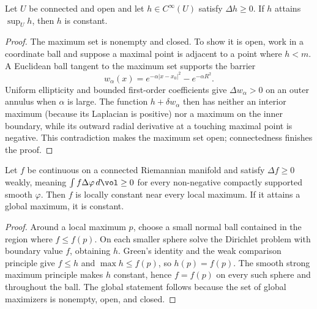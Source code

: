 \begin{lemma}
\label{lem:hopf-strong-maximum}



Let $U$ be connected and open and let $h\in C^\infty(U)$ satisfy
$\Delta h\ge0$. If $h$ attains $\sup_Uh$, then $h$ is constant.
\end{lemma}
\begin{proof}
\sketch
{}
\leanok
The maximum set is nonempty and closed. To show it is open, work in a
coordinate ball and suppose a maximal point is adjacent to a point where
$h<m$. A Euclidean ball tangent to the maximum set supports the barrier
$$w_\alpha(x)=e^{-\alpha|x-x_0|^2}-e^{-\alpha R^2}.$$
Uniform ellipticity and bounded first-order coefficients give
$\Delta w_\alpha>0$ on an outer annulus when $\alpha$ is large. The
function $h+\delta w_\alpha$ then has neither an interior maximum
(because its Laplacian is positive) nor a maximum on the inner boundary,
while its outward radial derivative at a touching maximal point is
negative. This contradiction makes the maximum set open; connectedness
finishes the proof.
\end{proof}

\begin{theorem}
\label{thm:maximum-principle}


Let $f$ be continuous on a connected Riemannian manifold and satisfy
$\Delta f\ge0$ weakly, meaning
$\int f\Delta\varphi\,d\vol\ge0$ for every non-negative compactly
supported smooth $\varphi$. Then $f$ is locally constant near every
local maximum. If it attains a global maximum, it is constant.
\end{theorem}
\begin{proof}
\sketch

Around a local maximum $p$, choose a small normal ball contained in the
region where $f\le f(p)$. On each smaller sphere solve the Dirichlet
problem with boundary value $f$, obtaining $h$. Green's identity and the
weak comparison principle give $f\le h$ and
$\max h\le f(p)$, so $h(p)=f(p)$. The smooth strong maximum principle
makes $h$ constant, hence $f=f(p)$ on every such sphere and throughout
the ball. The global statement follows because the set of global
maximizers is nonempty, open, and closed.
\end{proof}

